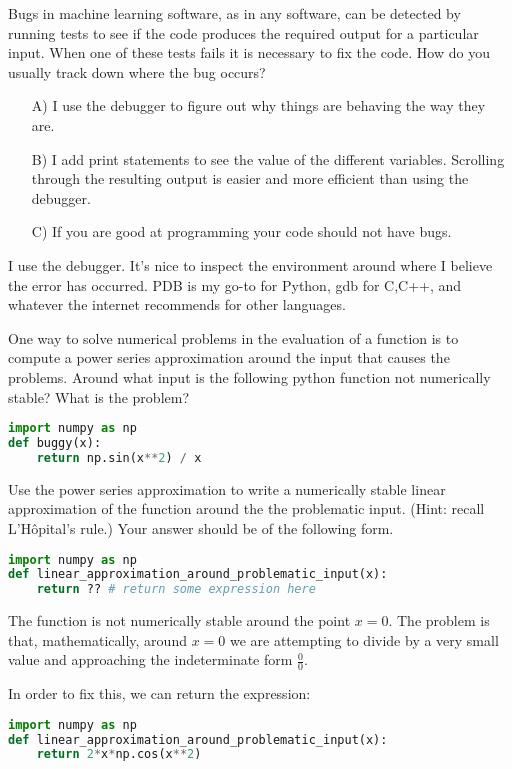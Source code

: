 \documentclass{harvardml}
\begin{document}
\begin{problem}
Bugs in machine learning software, as in any software, can be detected by running
tests to see if the code produces the required output for a particular input.
When one of these tests fails it is necessary to fix the code.  How do you usually track down where
the bug occurs?
\begin{itemize}
\item[A)] I use the debugger to figure out why things are behaving the way they are.
\item[B)] I add print statements to see the value of the different variables.
Scrolling through the resulting output is easier and more efficient than using the debugger.
\item[C)] If you are good at programming your code should not have bugs.
\end{itemize}
I use the debugger. It's nice to inspect the environment around where I believe the error has occurred. PDB is my go-to for Python, gdb for C,C++, and whatever the internet recommends for other languages.
\end{problem}


\begin{problem}[Stability]
One way to solve numerical problems in the evaluation of a function is to compute
a power series approximation around the input that causes the problems.
Around what input is the following python function not numerically stable?
What is the problem?

\begin{lstlisting}[language=python]
import numpy as np
def buggy(x):
    return np.sin(x**2) / x
\end{lstlisting}
Use the power series approximation to write a numerically stable linear approximation of the function around the the problematic input. (Hint: recall L'H\^opital's rule.) Your answer should be of the following form.

\begin{lstlisting}[language=python]
import numpy as np
def linear_approximation_around_problematic_input(x):
    return ?? # return some expression here
\end{lstlisting}
\end{problem}

The function is not numerically stable around the point $x = 0$. The problem is that, mathematically, around $x = 0$ we are attempting to divide by a very small value and approaching the indeterminate form $\frac{0}{0}$.

In order to fix this, we can return the expression:
\begin{lstlisting}[language=python]
import numpy as np
def linear_approximation_around_problematic_input(x):
    return 2*x*np.cos(x**2)
\end{lstlisting}
\end{document}
